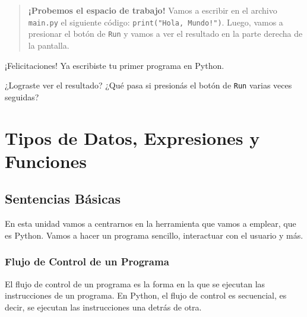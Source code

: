 \documentclass[
  letterpaper,
  DIV=11,
  numbers=noendperiod]{scrreprt}
\begin{document}
\begin{quote}
\textbf{¡Probemos el espacio de trabajo!} Vamos a escribir en el archivo
\texttt{main.py} el siguiente código: \texttt{print("Hola,\ Mundo!")}.
Luego, vamos a presionar el botón de \texttt{Run} y vamos a ver el
resultado en la parte derecha de la pantalla.
\end{quote}

¡Felicitaciones! Ya escribiste tu primer programa en Python.

\begin{tcolorbox}[enhanced jigsaw, opacitybacktitle=0.6, toptitle=1mm, toprule=.15mm, arc=.35mm, breakable, bottomrule=.15mm, opacityback=0, leftrule=.75mm, rightrule=.15mm, title=\textcolor{quarto-callout-note-color}{\faInfo}\hspace{0.5em}{Note}, left=2mm, bottomtitle=1mm, colframe=quarto-callout-note-color-frame, colback=white, titlerule=0mm, coltitle=black, colbacktitle=quarto-callout-note-color!10!white]

¿Lograste ver el resultado? ¿Qué pasa si presionás el botón de
\texttt{Run} varias veces seguidas?\\

\end{tcolorbox}


\chapter{Tipos de Datos, Expresiones y
Funciones}\label{tipos-de-datos-expresiones-y-funciones}

\section{Sentencias Básicas}\label{sentencias-buxe1sicas}

En esta unidad vamos a centrarnos en la herramienta que vamos a emplear,
que es Python. Vamos a hacer un programa sencillo, interactuar con el
usuario y más.

\subsection{Flujo de Control de un
Programa}\label{flujo-de-control-de-un-programa}

El flujo de control de un programa es la forma en la que se ejecutan las
instrucciones de un programa. En Python, el flujo de control es
secuencial, es decir, se ejecutan las instrucciones una detrás de otra.
\end{document}
